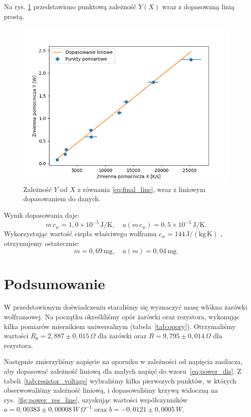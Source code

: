 \documentclass[12pt]{article}
\begin{document}
Na rys. \ref{fig:final_graph} przedstawiono punktową zależność $Y(X)$ wraz z dopasowaną linią prostą.
\begin{figure}[H]
    \centering
    \includegraphics[scale=0.7]{final_graph}
    \caption{Zależność $Y$ od $X$ z równania \eqref{eq:final_line}, wraz z liniowym dopasowaniem do danych.}
    \label{fig:final_graph}
\end{figure}
Wynik dopasowania daje:
\[
    m\,c_w = 1{,}0\times 10^{-5}\,\mathrm{J/K}, 
    \quad
    u(m\,c_w) = 0{,}5\times 10^{-5}\,\mathrm{J/K}.
\]
Wykorzystując wartość ciepła właściwego wolframu $c_w = 144\,\mathrm{J/(kg\,K)}$ \cite{heat_capacity}, otrzymujemy ostatecznie:
\[
    m =0{,}69\,\mathrm{mg},
    \quad
    u(m) = 0{,}04\,\mathrm{mg}.
\]

\newpage

\section{Podsumowanie}
W przedstawionym doświadczeniu staraliśmy się wyznaczyć masę włókna żarówki wolframowej. Na początku określiliśmy opór żarówki oraz rezystora, wykonując kilka pomiarów miernikiem uniwersalnym (tabela~\ref{tab:opory}). Otrzymaliśmy wartości $R_{0} = 2{,}887 \pm 0{,}015\,\Omega$ dla żarówki oraz $R = 9{,}795 \pm 0{,}014\,\Omega$ dla rezystora.

Następnie zmierzyliśmy napięcie na oporniku w zależności od napięcia zasilacza, aby dopasować zależność liniową dla małych napięć do wzoru~\ref{eq:power_dis}. Z tabeli~\ref{tab:resistor_voltage} wybraliśmy kilka pierwszych punktów, w których obserwowaliśmy zależność liniową, i dopasowaliśmy krzywą widoczną na rys.~\ref{fig:power_res_line}, uzyskując wartości współczynników $a=0{,}00383 \pm 0{,}00008\,W\,\Omega^{-1}$ oraz $b=-0{,}0121 \pm 0{,}0005\,W$.
\end{document}
